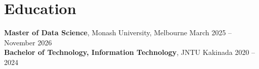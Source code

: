 \documentclass[10pt,a4paper]{article}
\begin{document}
\vspace{2pt}
\section{Education}
\textbf{Master of Data Science}, Monash University, Melbourne \hfill March 2025 -- November 2026\\
\textbf{Bachelor of Technology, Information Technology}, JNTU Kakinada \hfill 2020 -- 2024
\end{document}
